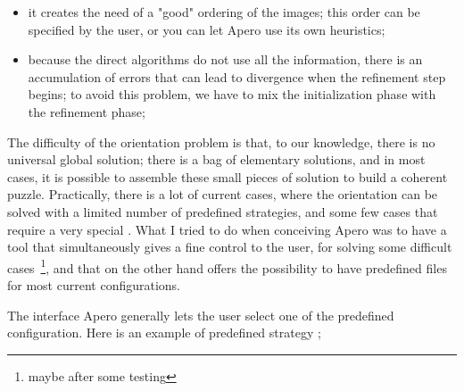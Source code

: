\begin{itemize}
   \item  it creates the need of a "good" ordering of the images;
           this order can be specified by the user, or you can let Apero use its
           own heuristics;

   \item   because the direct algorithms do not use all the information, there is an accumulation
           of errors that can lead to divergence when the refinement step begins; to avoid
           this problem, we have to mix the initialization phase with the refinement phase;

\end{itemize}



The difficulty of the orientation problem is that, to our knowledge, there is no
universal global solution; there is a bag of elementary solutions, and in most cases,
it is possible to assemble these small pieces of solution to build a coherent puzzle.
Practically, there is a lot of current cases, where the orientation can be solved
with a limited number of predefined strategies, and some few cases that
require a very special .
What I tried to do when conceiving Apero was to have a tool that simultaneously
gives a fine control to the user, for solving some difficult cases~\footnote{maybe
after some testing}, and that on the other hand offers the possibility to have
predefined files for most current configurations.

The interface  Apero generally lets the user select one of the predefined
configuration.
Here is an example of predefined strategy  ;




